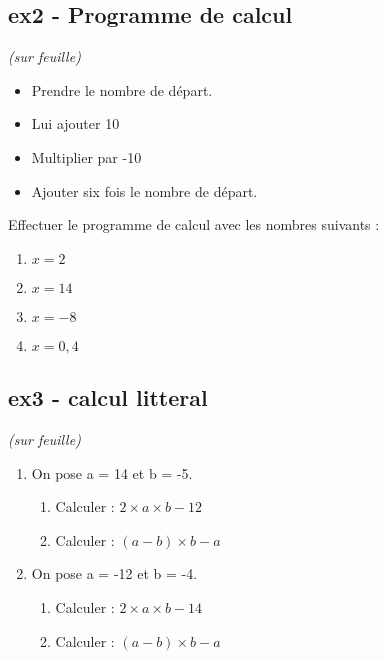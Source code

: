 \documentclass[11pt]{article}
\begin{document}
\begin{multicols}{2}

  \subsection*{ex2 - Programme de calcul}

  \textit{(sur feuille)}
  \begin{itemize}
  \item Prendre le nombre de départ.
  \item Lui ajouter 10
  \item Multiplier par -10 
  \item Ajouter six fois le nombre de départ. 
  \end{itemize}

  Effectuer le programme de calcul avec les nombres suivants :

  \begin{multicols}{2}

    \begin{enumerate}
    \item $x = 2$
    \item $x = 14$
    \item $x = -8$
    \item $x = 0,4$
    \end{enumerate}

  \end{multicols}

  \subsection*{ex3 - calcul litteral}

  \textit{(sur feuille)}
  \begin{enumerate}
  \item On pose a = 14 et b = -5.
    \begin{enumerate}
    \item Calculer : $2 \times a \times b - 12$
    \item Calculer : $(a - b)\times b - a$
    \end{enumerate}

  \item On pose a = -12 et b = -4.
    \begin{enumerate}
    \item Calculer : $2 \times a \times b - 14$
    \item Calculer : $(a - b)\times b - a$
    \end{enumerate}
  \end{enumerate}

\end{multicols}
\end{document}
